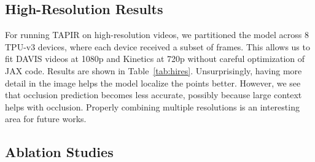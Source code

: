 \documentclass[10pt,twocolumn,letterpaper]{article}
\newcommand{\datasetname}{TAP-Vid}
\begin{document}
\subsection{High-Resolution Results}

\begin{table}[t]
\begin{center}
\caption{{\bf TAPIR at high resolution on \datasetname}.  Each video is resized so it is at most  pixels tall and  pixels wide for DAVIS, and  pixels tall and  pixels wide for Kinetics.}
\label{tab:hires}
\vspace{-0.3cm}
\end{center}
\end{table}

For running TAPIR on high-resolution videos, we partitioned the model across 8 TPU-v3 devices, where each device received a subset of frames.  This allows us to fit DAVIS videos at 1080p and Kinetics at 720p without careful optimization of JAX code.  Results are shown in Table~\ref{tab:hires}.
Unsurprisingly, having more detail in the image helps the model localize the points better.  However, we see that occlusion prediction becomes less accurate, possibly because large context helps with occlusion.  Properly combining multiple resolutions is an interesting area for future works.


\subsection{Ablation Studies}
\end{document}
